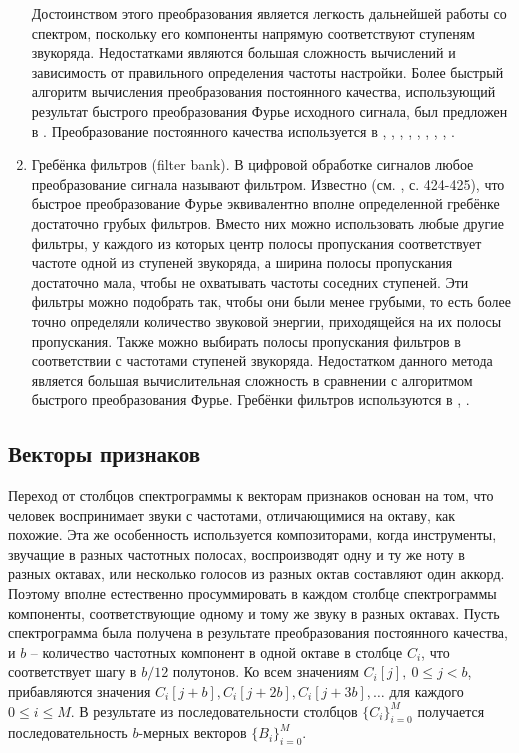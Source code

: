 \begin{enumerate}
  Достоинством этого преобразования является легкость дальнейшей работы со
  спектром, поскольку его компоненты напрямую соответствуют ступеням звукоряда.
  Недостатками являются большая сложность вычислений и зависимость от
  правильного определения частоты настройки. Более быстрый алгоритм вычисления
  преобразования постоянного качества, использующий результат быстрого
  преобразования Фурье исходного сигнала, был предложен в \cite{Brown1992}.
  Преобразование постоянного качества используется в \cite{Bello2005},
  \cite{Lee2006}, \cite{Mauch2008}, \cite{Mauch2009}, \cite{Oudre2009},
  \cite{Reed2009}, \cite{Cho2010}, \cite{Cho2011}, \cite{Ni2011}.
  
  \item Гребёнка фильтров (filter bank). В цифровой обработке сигналов любое
  преобразование сигнала называют фильтром. Известно (см. \cite{Rabiner1978}, с.
  424-425), что быстрое преобразование Фурье эквивалентно вполне определенной
  гребёнке достаточно грубых фильтров. Вместо них можно использовать любые
  другие фильтры, у каждого из которых центр полосы пропускания соответствует
  частоте одной из ступеней звукоряда, а ширина полосы пропускания достаточно
  мала, чтобы не охватывать частоты соседних ступеней. Эти фильтры можно
  подобрать так, чтобы они были менее грубыми, то есть более точно определяли
  количество звуковой энергии, приходящейся на их полосы пропускания. Также
  можно выбирать полосы пропускания фильтров в соответствии с частотами ступеней
  звукоряда. Недостатком данного метода является большая вычислительная
  сложность в сравнении с алгоритмом быстрого преобразования Фурье. Гребёнки
  фильтров используются в \cite{Jiang2011}, \cite{Humphrey2012}.
\end{enumerate}

\subsection{Векторы признаков} \label{ssectT_feat}

Переход от столбцов спектрограммы к векторам признаков основан на том, что
человек воспринимает звуки с частотами, отличающимися на октаву, как похожие.
Эта же особенность используется композиторами, когда инструменты, звучащие в
разных частотных полосах, воспроизводят одну и ту же ноту в разных октавах, или
несколько голосов из разных октав составляют один аккорд. Поэтому вполне
естественно просуммировать в каждом столбце спектрограммы компоненты,
соответствующие одному и тому же звуку в разных октавах. Пусть спектрограмма
была получена в результате преобразования постоянного качества, и $b$ --
количество частотных компонент в одной октаве в столбце $C_i$, что
соответствует шагу в $b/12$ полутонов. Ко всем значениям $C_i[j], ~ 0 \leq j <
b$, прибавляются значения $C_i[j+b], C_i[j+2b], C_i[j+3b], \ldots$ для каждого
$0 \leq i \leq M$. В результате из последовательности столбцов $\{C_i\}_{i=0}^M$
получается последовательность $b$-мерных векторов $\{B_i\}_{i=0}^M$.

